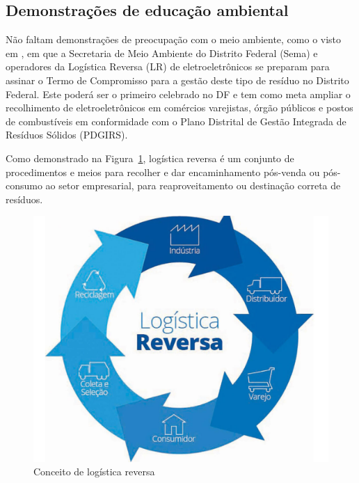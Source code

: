 \subsection{Demonstrações de educação ambiental}

Não faltam demonstrações de preocupação com o meio ambiente, como o visto em , em que a Secretaria de Meio Ambiente do Distrito Federal (Sema) e operadores da Logística Reversa (LR) de eletroeletrônicos se preparam para assinar o Termo de Compromisso para a gestão deste tipo de resíduo no Distrito Federal. Este poderá ser o primeiro celebrado no DF e tem como meta ampliar o recolhimento de eletroeletrônicos em comércios varejistas, órgão públicos e postos de combustíveis em conformidade com o Plano Distrital de Gestão Integrada de Resíduos Sólidos (PDGIRS).

Como demonstrado na Figura~\ref{fig:logistica-reversa}, logística reversa é um conjunto de procedimentos e meios para recolher e dar encaminhamento pós-venda ou pós-consumo ao setor empresarial, para reaproveitamento ou destinação correta de resíduos.

\begin{figure}[h]
    \centering
    \includegraphics[width=0.7\linewidth]{fig/Logistica-Reversa}
    \caption[Conceito de logística reversa]{Conceito de logística reversa}
    \label{fig:logistica-reversa}
\end{figure}



